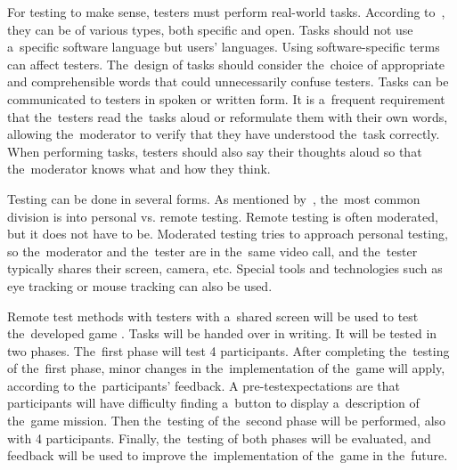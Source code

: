 For testing to make sense, testers must perform real-world tasks.
\linebreak
According to~\cite{moran_2019_usability}, they can be of various types, both specific and open.
Tasks should not use a~specific software language but users' languages.
Using software-specific terms can affect testers.
The~design of tasks should consider the~choice of appropriate and comprehensible words that could unnecessarily confuse testers.
Tasks can be communicated to testers in spoken or written form.
It is a~frequent requirement that the~testers read the~tasks aloud or reformulate them with their own words, allowing the~moderator to verify that they have understood the~task correctly.
When performing tasks, testers should also say their thoughts aloud so that the~moderator knows what and how they think.

Testing can be done in several forms.
As mentioned by~\cite{moran_2019_usability}, the~most common division is into personal vs. remote testing.
Remote testing is often moderated, but it does not have to be.
Moderated testing tries to approach personal testing, so the~moderator and the~tester are in the~same video call, and the~tester typically shares their screen, camera, etc.
Special tools and technologies such as eye tracking or mouse tracking can also be used.

Remote test methods with testers with a~shared screen will be used to test the~developed game \myAppName{}.
Tasks will be handed over in writing.
\linebreak
It will be tested in two phases.
The~first phase will test 4 participants.
After completing the~testing of the~first phase, minor changes in the~implementation of the~game will apply, according to the~participants' feedback.
A pre-test\linebreak{}expectations are that participants will have difficulty finding a~button to \mbox{display} a~description of the~game mission.
Then the~testing of the~second phase will be performed, also with 4 participants.
Finally, the~testing of both phases will be evaluated, and feedback will be used to improve the~implementation of the~game in the~future.

